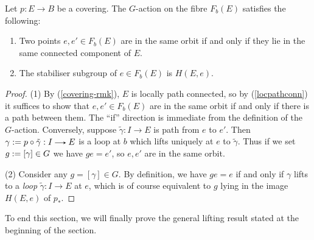 \begin{proposition}
  \label{pi1-action-props}
  Let $p : E \to B$ be a covering. The $G$-action on the fibre
  $F_b(E)$ satisfies the following:
  \begin{enumerate}
  \item \label{orbit} Two points $e,e' \in F_b(E)$ are in the same
    orbit if and only if they lie in the same connected component of
    $E$.
  \item \label{stab} The stabiliser subgroup of $e \in F_b(E)$ is
    $H(E,e)$.
  \end{enumerate}
\end{proposition}

\begin{proof}
  (1) By (\ref{covering-rmk}), $E$ is locally path connected, so by
  (\ref{locpathconn}) it suffices to show that $e,e' \in F_b(E)$ are
  in the same orbit if and only if there is a path between them. The
  ``if'' direction is immediate from the definition of the
  $G$-action. Conversely, suppose $\tilde\gamma : I \to E$ is path
  from $e$ to $e'$. Then $\gamma \ce p \circ \tilde \gamma : I
  \to E$ is a loop at $b$ which lifts uniquely at $e$ to
  $\tilde\gamma$. Thus if we set $g \mathrel{:=} [\gamma] \in G$ we have
  $ge = e'$, so $e,e'$ are in the same orbit.

  (2) Consider any $g = [\gamma] \in G$. By definition, we have $ge =
  e$ if and only if $\gamma$ lifts to a \emph{loop} $\tilde \gamma : I
  \to E$ at $e$, which is of course equivalent to $g$ lying in the
  image $H(E,e)$ of $p_*$.
\end{proof}

To end this section, we will finally prove the general lifting result
stated at the beginning of the section.

